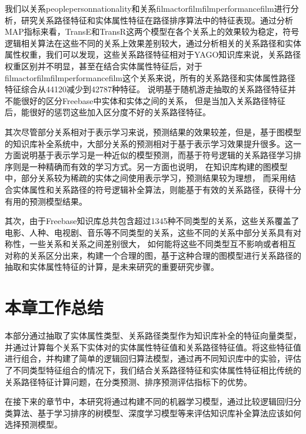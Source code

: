 我们以关系peoplepersonnationality和关系filmactorfilmfilmperformancefilm进行分析，研究关系路径特征和实体属性特征在路径排序算法中的特征表现。通过分析MAP指标来看，TransE和TransR这两个模型在各个关系上的效果较为稳定，符号逻辑相关算法在这些不同的关系上效果差别较大，通过分析相关的关系路径和实体属性权重，我们可以发现，这些关系路径特征相对于YAGO知识库来说，关系路径权重区别并不明显，甚至在结合实体属性特征后，对于filmactorfilmfilmperformancefilm这个关系来说，所有的关系路径和实体属性路径特征综合从44120减少到42787种特征。
说明基于随机游走抽取的关系路径特征并不能很好的区分Freebase中实体和实体之间的关系，
但是当加入关系路径特征后，能很好的惩罚这些加入区分度不好的关系路径特征。

其次尽管部分关系相对于表示学习来说，预测结果的效果较差，但是，基于图模型的知识库补全系统中，大部分关系的预测相对于基于表示学习效果提升很多。这一方面说明基于表示学习是一种近似的模型预测，而基于符号逻辑的关系路径学习排序则是一种精确而有效的学习方式。另一方面也说明，
在知识库构建的图模型中，部分关系较为稀疏的实体之间使用表示学习，预测结果较为理想，
而采用结合实体属性和关系路径的符号逻辑补全算法，则能基于有效的关系路径，获得十分有用的预测模型结果。

其次，由于Freebase知识库总共包含超过1345种不同类型的关系，这些关系覆盖了电影、人种、电视剧、音乐等不同类型的关系，这些不同的关系中部分关系具有对称性，一些关系和关系之间差别很大，
如何能将这些不同类型互不影响或者相互对称的关系区分出来，构建一个合理的图，基于这种合理的图模型进行关系路径的抽取和实体属性特征的计算，是未来研究的重要研究步骤。

\section{本章工作总结}
本部分通过抽取了实体属性类型、关系路径类型作为知识库补全的特征向量类型，并通过计算每个关系下实体对的实体属性特征值和关系路径特征值。将这些特征值进行组合，并构建了简单的逻辑回归算法模型，通过再不同知识库中的实验，评估了不同类型特征组合的情况下，我们结合关系路径特征和实体属性特征相比传统的关系路径特征计算问题，在分类预测、排序预测评估指标下的优势。

在接下来的章节中，本研究将通过构建不同的机器学习模型，通过比较逻辑回归分类算法、基于学习排序的树模型、深度学习模型等来评估知识库补全算法应该如何选择预测模型。 
